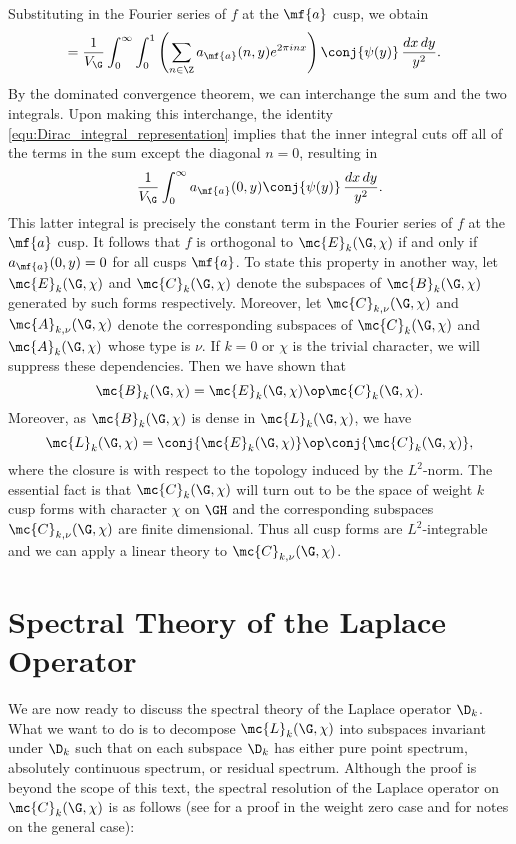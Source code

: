     Substituting in the Fourier series of $f$ at the $\mf{a}$ cusp, we obtain
    \begin{align*}
       &= \frac{1}{V_{\G}}\int_{0}^{\infty}\int_{0}^{1}\left(\sum_{n \in \Z}a_{\mf{a}}(n,y)e^{2\pi inx}\right)\conj{\psi(y)}\,\frac{dx\,dy}{y^{2}}.
    \end{align*}
    By the dominated convergence theorem, we can interchange the sum and the two integrals. Upon making this interchange, the identity \cref{equ:Dirac_integral_representation} implies that the inner integral cuts off all of the terms in the sum except the diagonal $n = 0$, resulting in
    \[
      \frac{1}{V_{\G}}\int_{0}^{\infty}a_{\mf{a}}(0,y)\conj{\psi(y)}\,\frac{dx\,dy}{y^{2}}.
    \]
    This latter integral is precisely the constant term in the Fourier series of $f$ at the $\mf{a}$ cusp. It follows that $f$ is orthogonal to $\mc{E}_{k}(\G,\chi)$ if and only if $a_{\mf{a}}(0,y) = 0$ for all cusps $\mf{a}$. To state this property in another way, let $\mc{E}_{k}(\G,\chi)$ and $\mc{C}_{k}(\G,\chi)$ denote the subspaces of $\mc{B}_{k}(\G,\chi)$ generated by such forms respectively. Moreover, let $\mc{C}_{k,\nu}(\G,\chi)$ and $\mc{A}_{k,\nu}(\G,\chi)$ denote the corresponding subspaces of $\mc{C}_{k}(\G,\chi)$ and $\mc{A}_{k}(\G,\chi)$ whose type is $\nu$. If $k = 0$ or $\chi$ is the trivial character, we will suppress these dependencies. Then we have shown that
    \[
      \mc{B}_{k}(\G,\chi) = \mc{E}_{k}(\G,\chi) \op \mc{C}_{k}(\G,\chi).
    \]
    Moreover, as $\mc{B}_{k}(\G,\chi)$ is dense in $\mc{L}_{k}(\G,\chi)$, we have
    \[
      \mc{L}_{k}(\G,\chi) = \conj{\mc{E}_{k}(\G,\chi)} \op \conj{\mc{C}_{k}(\G,\chi)},
    \]
    where the closure is with respect to the topology induced by the $L^{2}$-norm. The essential fact is that $\mc{C}_{k}(\G,\chi)$ will turn out to be the space of weight $k$ cusp forms with character $\chi$ on $\GH$ and the corresponding subspaces $\mc{C}_{k,\nu}(\G,\chi)$ are finite dimensional. Thus all cusp forms are $L^{2}$-integrable and we can apply a linear theory to $\mc{C}_{k,\nu}(\G,\chi)$.
  \section{Spectral Theory of the Laplace Operator}
    We are now ready to discuss the spectral theory of the Laplace operator $\D_{k}$. What we want to do is to decompose $\mc{L}_{k}(\G,\chi)$ into subspaces invariant under $\D_{k}$ such that on each subspace $\D_{k}$ has either pure point spectrum, absolutely continuous spectrum, or residual spectrum. Although the proof is beyond the scope of this text, the spectral resolution of the Laplace operator on $\mc{C}_{k}(\G,\chi)$ is as follows (see \cite{iwaniec2002spectral} for a proof in the weight zero case and \cite{duke2002subconvexity} for notes on the general case):

